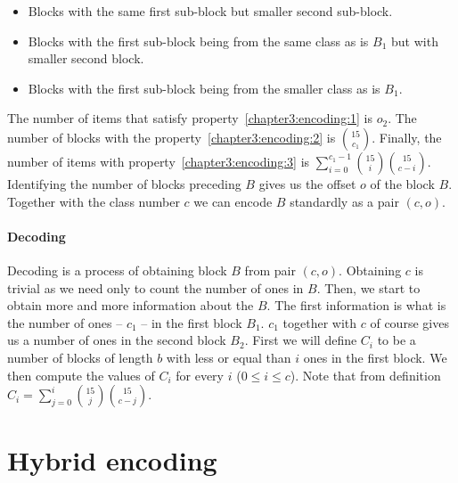 \begin{itemize}
    \item Blocks with the same first sub-block but smaller second sub-block. \label{chapter3:encoding:1}
    \item Blocks with the first sub-block being from the same class as is $B_1$ but with smaller second block. \label{chapter3:encoding:2}
    \item Blocks with the first sub-block being from the smaller class as is $B_1$. \label{chapter3:encoding:3}
\end{itemize}

The number of items that satisfy property~\ref{chapter3:encoding:1} is $o_2$. The number of blocks with the
property~\ref{chapter3:encoding:2} is ${15\choose c_1}$. Finally, the number of items with property~\ref{chapter3:encoding:3}
is $\sum_{i=0}^{c_1-1} {15\choose i} {15\choose c-i}$. Identifying the number of blocks preceding $B$ gives us the offset
$o$ of the block $B$. Together with the class number $c$ we can encode $B$ standardly as a pair $(c, o)$.

\paragraph{Decoding}

Decoding is a process of obtaining block $B$ from pair $(c, o)$. Obtaining $c$ is trivial as we need only to count the
number of ones in $B$. Then, we start to obtain more and more information about the $B$. The first information is what
is the number of ones -- $c_1$ -- in the first block $B_1$. $c_1$ together with $c$ of course gives us a number of
ones in the second block $B_2$. First we will define $C_i$ to be a number of blocks of length $b$ with less or equal than
$i$ ones in the first block. We then compute the values of $C_i$ for every $i$ ($0\leq i\leq c$). Note that from definition
$C_i = \sum_{j=0}^{i} {15 \choose j} {15 \choose c-j}$.

\section{Hybrid encoding}